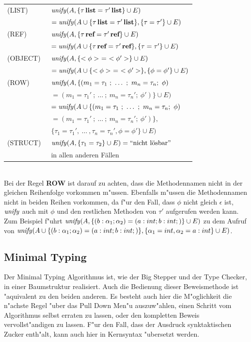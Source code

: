 \begin{tabular}{ll}
  (LIST)\     & ${\text{\it unify\/}}(A,\{\tau\,\textbf{list} = \tau'\,\textbf{list} \} \cup E)$\\[1mm]
              & \quad $= {\text{\it unify\/}}(A \cup \{\tau\,\textbf{list} = \tau'\,\textbf{list} \},
                         \{\tau = \tau' \} \cup E)$\\[3mm]
  (REF)\      & ${\text{\it unify\/}}(A,\{\tau\,\textbf{ref} = \tau'\,\textbf{ref} \} \cup E)$\\[1mm]
              & \quad $= {\text{\it unify\/}}(A \cup \{\tau\,\textbf{ref} = \tau'\,\textbf{ref} \},
                         \{\tau = \tau' \} \cup E)$\\[3mm]
  (OBJECT)\   & ${\text{\it unify\/}}(A,\{<\phi>\ =\ <\phi'> \} \cup E)$\\[1mm]
              & \quad $= {\text{\it unify\/}}(A \cup \{<\phi>\ =\ <\phi'> \},
                         \{\phi = \phi' \} \cup E)$\\[3mm]
  (ROW)\      & ${\text{\it unify\/}}(A,\{ (m_1 = \tau_1\ ;\ \ldots\ ;\ m_n = \tau_n;\ \phi)$\\
              & \quad $= (m_1 = \tau_1'\ ;\ \ldots\ ;\ m_n = \tau_n';\ \phi') \} \cup E)$\\[1mm]
              & \quad $= {\text{\it unify\/}}(A \cup \{ (m_1 = \tau_1\ ;\ \ldots\ ;\ m_n = \tau_n;\ \phi)$\\
              & \quad \quad $= (m_1 = \tau_1'\ ;\ \ldots\ ;\ m_n = \tau_n';\ \phi') \},$\\
              & \quad \quad \quad $\{\tau_1 = \tau_1', \ \ldots\ ,\tau_n = \tau_n',
                \phi = \phi' \} \cup E)$\\[3mm]
  (STRUCT)\   & ${\text{\it unify\/}}(A,\{\tau_1 = \tau_2\} \cup E) = \mbox{``nicht l\"osbar''}$\\[1mm]
              & in  allen anderen F\"allen
\end{tabular}\\[6mm]
Bei der Regel {\bf ROW} ist darauf zu achten, dass die Methodennamen nicht in der gleichen Reihenfolge
vorkommen m"ussen. Ebenfalls m"ussen die Methodennamen nicht in beiden Reihen vorkommen, da f"ur den Fall, 
dass $\phi$ nicht gleich $\epsilon$ ist, ${\text{\it unify\/}}$ auch mit $\phi$ und den restlichen Methoden von $\tau'$ 
aufgerufen werden kann. Zum Beispiel f"uhrt ${\text{\it unify\/}} (A,\{ (b: \alpha_1 ; \alpha_2) = (a: int ; b: int ;)\}
\cup E)$ zu dem Aufruf von ${\text{\it unify\/}} (A \cup \{ (b: \alpha_1 ; \alpha_2) = (a: int ; b: int ;)\},
\{\alpha_1 = int, \alpha_2 = a: int\} \cup E)$.

\subsection{Minimal Typing}
Der Minimal Typing Algorithmus ist, wie der Big Stepper und der Type Checker, in einer Baumstruktur realisiert.
Auch die Bedienung dieser Beweismethode ist "aquivalent zu den beiden anderen. Es besteht auch hier die M"oglichkeit
die n"achste Regel "uber das Pull Down Men"u auszuw"ahlen, einen Schritt vom Algorithmus selbst erraten zu lassen,
oder den kompletten Beweis vervollst"andigen zu lassen. F"ur den Fall, dass der Ausdruck synktaktischen Zucker 
enth"alt, kann auch hier in Kernsyntax "ubersetzt werden.

